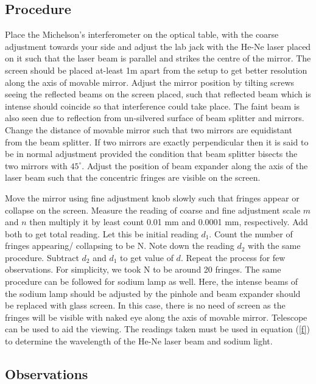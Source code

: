 \documentclass[a4paper, amsfonts, amssymb, amsmath, reprint, showkeys, nofootinbib, twoside]{revtex4-1}
\begin{document}
\subsection{Procedure}
Place the Michelson's interferometer on the optical table, with the coarse adjustment towards your side and adjust the lab jack with the He-Ne laser placed on it such that the laser beam is parallel and strikes the centre of the mirror. The screen should be placed at-least 1m apart from the setup to get better resolution along the axis of movable mirror. Adjust the mirror position by tilting screws seeing the reflected beams on the screen placed, such that reflected beam which is intense should coincide so that interference could take place. The faint beam is also seen due to reflection from un-silvered surface of beam splitter and mirrors. Change the distance of movable mirror such that two mirrors are equidistant from the beam splitter. If two mirrors are exactly perpendicular then it is said to be in normal adjustment provided the condition that beam splitter bisects the two mirrors with $45^{\circ}$. Adjust the position of beam expander along the axis of the laser beam such that the concentric fringes are visible on the screen. 

Move the mirror using fine adjustment knob slowly such that fringes appear or collapse on the screen. Measure the reading of coarse and fine adjustment scale $m$ and $n$ then multiply it by least count 0.01 mm and 0.0001 mm, respectively. Add both to get total reading. Let this be initial reading $d_1$. Count the number of fringes appearing/ collapsing to be N. Note down the reading $d_2$ with the same procedure. Subtract $d_2$ and $d_1$ to get value of $d$. Repeat the process for few observations. For simplicity, we took N to be around 20 fringes. The same procedure can be followed for sodium lamp as well. Here, the intense beams of the sodium lamp should be adjusted by the pinhole and beam expander should be replaced with glass screen. In this case, there is no need of screen as the fringes will be visible with naked eye along the axis of movable mirror. Telescope can be used to aid the viewing. The readings taken must be used in equation (\ref{f}) to determine the wavelength of the He-Ne laser beam and sodium light. 

\subsection{Observations}
\end{document}
